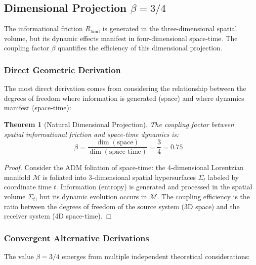 \documentclass[11pt, a4paper]{article}
\theoremstyle{plain}
\newtheorem{theorem}{Theorem}[section]
\theoremstyle{definition}
\newcommand{\Rfactor}{R_{\text{fund}}}
\begin{document}
\subsection{Dimensional Projection \texorpdfstring{$\beta = 3/4$}{β=3/4}}

The informational friction $\Rfactor$ is generated in the three-dimensional spatial volume, but its dynamic effects manifest in four-dimensional space-time. The coupling factor $\beta$ quantifies the efficiency of this dimensional projection.

\subsubsection{Direct Geometric Derivation}

The most direct derivation comes from considering the relationship between the degrees of freedom where information is generated (space) and where dynamics manifest (space-time):

\begin{theorem}[Natural Dimensional Projection]
The coupling factor between spatial informational friction and space-time dynamics is:
\begin{equation}
\boxed{\beta = \frac{\dim(\text{space})}{\dim(\text{space-time})} = \frac{3}{4} = 0.75}
\label{eq:beta_derivation}
\end{equation}
\end{theorem}

\begin{proof}
Consider the ADM foliation of space-time: the 4-dimensional Lorentzian manifold $\mathcal{M}$ is foliated into 3-dimensional spatial hypersurfaces $\Sigma_t$ labeled by coordinate time $t$. Information (entropy) is generated and processed in the spatial volume $\Sigma_t$, but its dynamic evolution occurs in $\mathcal{M}$. The coupling efficiency is the ratio between the degrees of freedom of the source system (3D space) and the receiver system (4D space-time).
\end{proof}

\subsubsection{Convergent Alternative Derivations}

The value $\beta = 3/4$ emerges from multiple independent theoretical considerations:
\end{document}
